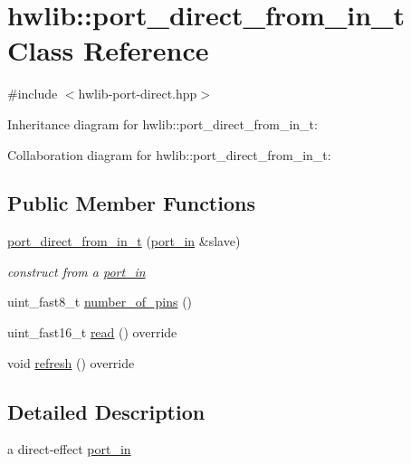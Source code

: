 \hypertarget{classhwlib_1_1port__direct__from__in__t}{}\section{hwlib\+:\+:port\+\_\+direct\+\_\+from\+\_\+in\+\_\+t Class Reference}
\label{classhwlib_1_1port__direct__from__in__t}


{\ttfamily \#include $<$hwlib-\/port-\/direct.\+hpp$>$}



Inheritance diagram for hwlib\+:\+:port\+\_\+direct\+\_\+from\+\_\+in\+\_\+t\+:


Collaboration diagram for hwlib\+:\+:port\+\_\+direct\+\_\+from\+\_\+in\+\_\+t\+:
\subsection*{Public Member Functions}
\begin{DoxyCompactItemize}
\item 
\mbox{\label{classhwlib_1_1port__direct__from__in__t_a64d30b957bb5f282287ec5233b9609b3}} 
\hyperlink{classhwlib_1_1port__direct__from__in__t_a64d30b957bb5f282287ec5233b9609b3}{port\+\_\+direct\+\_\+from\+\_\+in\+\_\+t} (\hyperlink{classhwlib_1_1port__in}{port\+\_\+in} \&slave)
\begin{DoxyCompactList}\small\item\em construct from a \hyperlink{classhwlib_1_1port__in}{port\+\_\+in} \end{DoxyCompactList}\item 
uint\+\_\+fast8\+\_\+t \hyperlink{classhwlib_1_1port__direct__from__in__t_a12ce68f2d796d1ddcf8b7ae1033d83a1}{number\+\_\+of\+\_\+pins} ()
\item 
uint\+\_\+fast16\+\_\+t \hyperlink{classhwlib_1_1port__direct__from__in__t_a19f5b6527913815e206cfc2e93a52d1e}{read} () override
\item 
void \hyperlink{classhwlib_1_1port__direct__from__in__t_ab6b6bdd7d83f3ef606960950e4c281c0}{refresh} () override
\end{DoxyCompactItemize}


\subsection{Detailed Description}
a direct-\/effect \hyperlink{classhwlib_1_1port__in}{port\+\_\+in}

